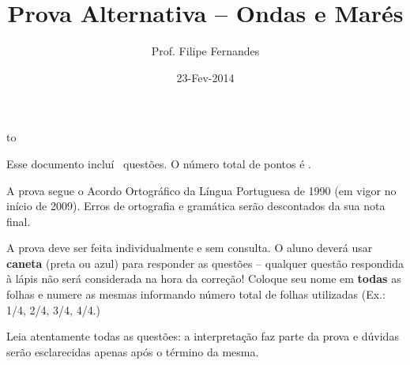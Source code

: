 \documentclass[letterpaper,portuguese,12pt,pdftex]{exam}
\title{Prova Alternativa -- Ondas e Marés}
\author{Prof. Filipe Fernandes}
\date{23-Fev-2014}
\begin{document}
\maketitle
\doublespacing

\vspace{2cm}
\hbox to \textwidth{Nome e número de matrícula:\enspace\hrulefill}
\vspace{2cm}

\begin{minipage}{.8\textwidth}
Esse documento incluí \numquestions\ questões. O número total de pontos é \numpoints.
\vspace{1cm}

A prova segue o Acordo Ortográfico da Língua Portuguesa de 1990 (em vigor no
início de 2009).  Erros de ortografia e gramática serão descontados da sua nota
final.

\vspace{1cm}

A prova deve ser feita individualmente e sem consulta.  O aluno deverá usar
{\bf caneta} (preta ou azul) para responder as questões -- qualquer questão
respondida à lápis não será considerada na hora da correção!  Coloque seu nome
em {\bf todas} as folhas e numere as mesmas informando número total de folhas
utilizadas (Ex.: 1/4, 2/4, 3/4, 4/4.)

\vspace{1cm}

Leia atentamente todas as questões: a interpretação faz parte da prova e dúvidas
serão esclarecidas apenas após o término da mesma.

\end{minipage}

\clearpage
\end{document}

